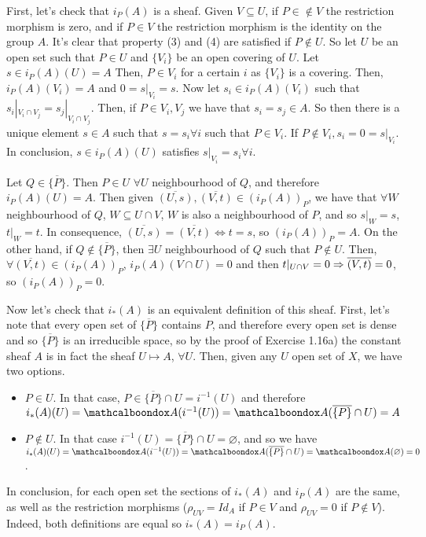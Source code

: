 \begin{sol}
	First, let's check that $i_P(A)$ is a sheaf. Given $V \subseteq U$, if $P \in \notin V$ the restriction morphism is zero, and if $P \in V$ the restriction morphism is the identity on the group $A$. It's clear that property (3) and (4) are satisfied if $P \notin U$. So let $U$ be an open set such that $P \in U$ and $\{V_i\}$ be an open covering of $U$. Let $s \in i_P(A)(U) = A$ Then, $P \in V_i$ for a certain $i$ as $\{V_i\}$ is a covering. Then, $i_P(A)(V_i) = A$ and $0 = s|_{V_i} = s$. Now let $s_i \in i_P(A)(V_i)$ such that $s_i|_{V_i \cap V_j} = s_j|_{V_i \cap V_j}$. Then, if $P \in V_i, V_j$ we have that $s_i = s_j \in A$. So then there is a unique element $s \in A$ such that $s = s_i \forall i$ such that $P \in V_i$. If $P \notin V_i, s_i = 0 = s|_{V_i}$. In conclusion, $s \in i_P(A)(U)$ satisfies $s|_{V_i} = s_i \forall i$.

	Let $Q \in \overline{\{P\}}$. Then $P \in U \, \, \forall U$ neighbourhood of $Q$, and therefore $i_P(A)(U) = A$. Then given $\overline{(U,s)}, \overline{(V,t)} \in (i_P(A))_P$, we have that $\forall W$ neighbourhood of $Q$, $W \subseteq U \cap V$, $W$ is also a neighbourhood of $P$, and so $s|_W = s$, $t|_W = t$. In consequence, $\overline{(U,s)} = \overline{(V,t)} \iff t = s$, so $(i_P(A))_P = A$.	On the other hand, if $Q \notin \overline{\{P\}}$, then $\exists U$ neighbourhood of $Q$ such that $P \notin U$. Then, $\forall \overline{(V,t)} \in (i_P(A))_P$, $i_P(A)(V \cap U) = 0$ and then $t|_{U \cap V} = 0 \Rightarrow \overline{(V,t)} = 0$, so $(i_P(A))_P = 0$.

	Now let's check that $i_{*}(A)$ is an equivalent definition of this sheaf. First, let's note that every open set of $\overline{\{P\}}$ contains $P$, and therefore every open set is dense and so $\overline{\{P\}}$ is an irreducible space, so by the proof of Exercise 1.16a) the constant sheaf $A$ is in fact the sheaf $U \mapsto A$, $\forall U$. Then, given any $U$ open set of $X$, we have two options.
	\begin{itemize}
		\item $P \in U$. In that case, $P \in \overline{\{P\}} \cap U = i^{-1}(U)$ and therefore $i_{*}(A)(U) = \sA(i^{-1}(U)) = \sA(\overline{\{P\}} \cap U) = A$

		\item $P \notin U$. In that case $i^{-1}(U) = \overline{\{P\}} \cap U = \varnothing$, and so we have $i_{*}(A)(U) = \sA(i^{-1}(U)) = \sA(\overline{\{P\}} \cap U) = \sA(\varnothing) = 0$.
	\end{itemize}
	In conclusion, for each open set the sections of $i_{*}(A)$ and  $i_P(A)$ are the same, as well as the restriction morphisms ($\rho_{UV} = Id_A$ if $P \in V$ and $\rho_{UV} = 0$ if $P \notin V$). Indeed, both definitions are equal so $i_{*}(A) = i_P(A)$.
\end{sol}

